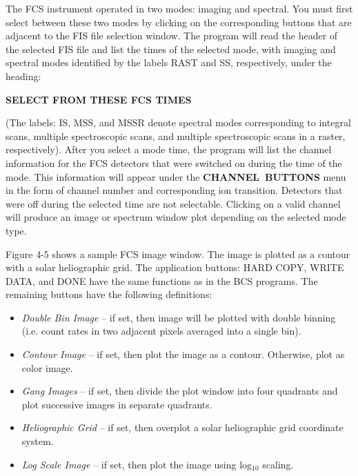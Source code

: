 {{{The FCS instrument operated in two modes: imaging and spectral. You must first
select between these two modes by clicking on the corresponding buttons that
are adjacent to the FIS file selection window. The program will read the header
of the selected FIS file and list the times of the selected mode, with imaging
and spectral modes identified by the labels RAST and SS, respectively,  under
the heading:
\newline
\newline
\centerline{\bf SELECT FROM THESE FCS TIMES} \noindent
\newline
\newline
(The labels: IS, MSS, and MSSR denote spectral modes  corresponding to integral
scans, multiple spectroscopic scans, and multiple spectroscopic scans in a
raster, respectively). After you select a mode time, the program  will list
the channel information for the FCS detectors that were switched on during the
time of the mode. This information will appear under the \hbox{\bf CHANNEL
BUTTONS} menu in the form of channel number and corresponding ion transition.
Detectors that were off during the selected time are not selectable. Clicking
on a valid channel will produce an image or spectrum window plot depending on
the selected mode type.

Figure 4-5 shows a sample FCS image window. The image is plotted as a contour
with
a solar heliographic grid. The application buttons: HARD COPY, WRITE DATA, and
DONE
have the same functions as in the BCS programs. The remaining buttons have the
following definitions:

\begin{itemize}

\item{\it Double Bin Image } -- if set, then image will be plotted
with double binning
(i.e. count rates in two adjacent pixels averaged into a single bin).

\item{\it Contour Image} -- if set, then plot the image as a contour.
Otherwise, plot as color image.

\item{\it Gang Images} -- if set, then divide the plot window into
four quadrants and plot successive images in separate quadrants.

\item{\it Heliographic Grid} -- if set, then overplot a solar
heliographic grid coordinate system.

\item{\it Log Scale Image} -- if set, then plot the image
using log$_{10}$ scaling.


\end{itemize}}}}
